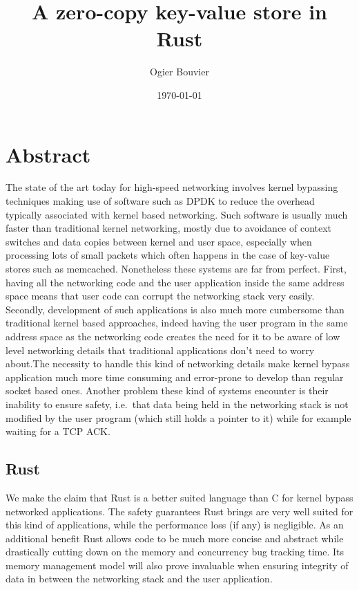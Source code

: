 \documentclass[11pt]{article}
\author{Ogier Bouvier}
\date{\today}
\title{A zero-copy key-value store in Rust}
\begin{document}
\maketitle
{}
\tableofcontents
\newpage

\setcounter{page}{1}
\section{Abstract}

The state of the art today for high-speed networking involves kernel
bypassing techniques making use of software such as DPDK to reduce the
overhead typically associated with kernel based networking. Such
software is usually much faster than traditional kernel networking,
mostly due to avoidance of context switches and data copies between
kernel and user space, especially when processing lots of small
packets which often happens in the case of key-value stores such as
memcached. Nonetheless these systems are far from perfect. First,
having all the  networking code and the user application inside the
same address space means that user code can corrupt the networking
stack very easily. Secondly, development of such applications is also
much more cumbersome than traditional kernel based approaches, indeed
having the user program in the same address space as the networking
code creates the need for it to be aware of low level networking
details that traditional applications don't need to worry about.The
necessity to handle this kind of networking details make kernel bypass
application much more time consuming and error-prone to develop than
regular socket based ones. Another problem these kind of systems
encounter is their inability to ensure safety, i.e.\ that data being
held in the networking stack is not modified by the user program
(which still holds a pointer to it) while for example waiting for a
TCP ACK.

\subsection{Rust}

We make the claim that Rust is a better suited language than C for
kernel bypass networked applications. The safety guarantees Rust
brings are very well suited for this kind of applications, while the
performance loss (if any) is negligible. As an additional benefit Rust
allows code to be much more concise and abstract while drastically
cutting down on the memory and concurrency bug tracking time. Its
memory management model will also prove invaluable when ensuring
integrity of data in between the networking stack and the user
application.
\end{document}
